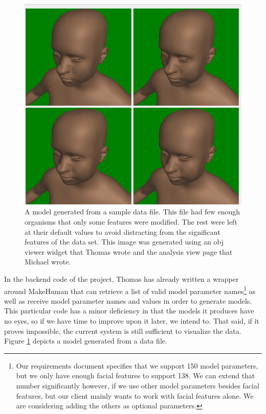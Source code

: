 \documentclass[letterpaper,10pt, onecolumn, draftclsnofoot]{IEEEtran}
\begin{document}
\begin{figure}
	\includegraphics[width=\textwidth]{analysis}
	\caption{A model generated from a sample data file. This file had few enough organisms that only some features were modified. The rest were left at their default values to avoid distracting from the significant features of the data set. This image was generated using an obj viewer widget that Thomas wrote and the analysis view page that Michael wrote.}
	\label{fig:generated}
\end{figure}

In the backend code of the project, Thomas has already written a wrapper around MakeHuman that can retrieve a list of valid model parameter names\footnote{Our requirements document specifies that we support 150 model parameters, but we only have enough facial features to support 138. We can extend that number significantly however, if we use other model parameters besides facial features, but our client mainly wants to work with facial features alone. We are considering adding the others as optional parameters.} as well as receive model parameter names and values in order to generate models. This particular code has a minor deficiency in that the models it produces have no eyes, so if we have time to improve upon it later, we intend to. That said, if it proves impossible, the current system is still sufficient to visualize the data. Figure \ref{fig:generated} depicts a model generated from a data file.
\end{document}
